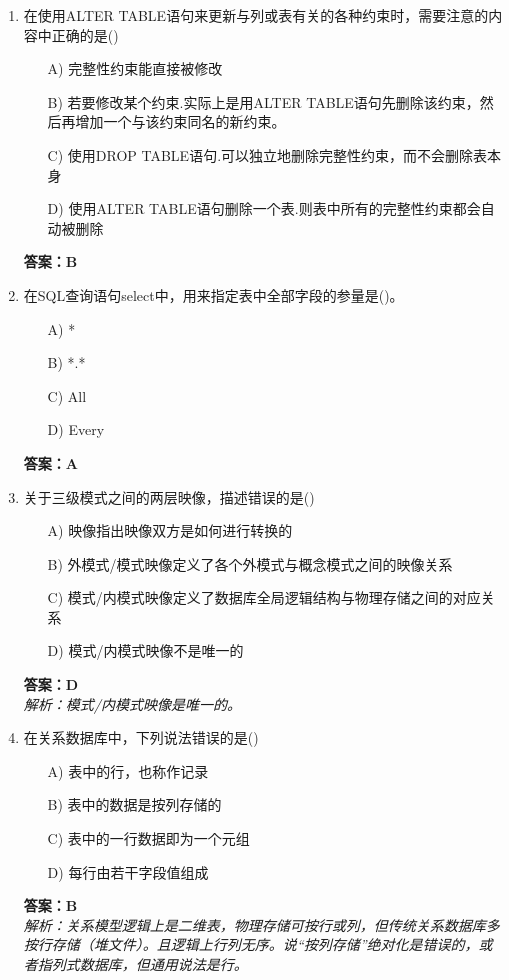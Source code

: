 \documentclass[a4paper,12pt]{article}
\begin{document}
\begin{enumerate}[label=\arabic*.]
\item 在使用ALTER TABLE语句来更新与列或表有关的各种约束时，需要注意的内容中正确的是()
\begin{itemize}
    \item[A)] 完整性约束能直接被修改
    \item[B)] 若要修改某个约束.实际上是用ALTER TABLE语句先删除该约束，然后再增加一个与该约束同名的新约束。
    \item[C)] 使用DROP TABLE语句.可以独立地删除完整性约束，而不会删除表本身
    \item[D)] 使用ALTER TABLE语句删除一个表.则表中所有的完整性约束都会自动被删除
\end{itemize}
\textbf{答案：B}

\item 在SQL查询语句select中，用来指定表中全部字段的参量是()。
\begin{itemize}
    \item[A)] *
    \item[B)] *.*
    \item[C)] All
    \item[D)] Every
\end{itemize}
\textbf{答案：A}

\item 关于三级模式之间的两层映像，描述错误的是()
\begin{itemize}
    \item[A)] 映像指出映像双方是如何进行转换的
    \item[B)] 外模式/模式映像定义了各个外模式与概念模式之间的映像关系
    \item[C)] 模式/内模式映像定义了数据库全局逻辑结构与物理存储之间的对应关系
    \item[D)] 模式/内模式映像不是唯一的
\end{itemize}
\textbf{答案：D} \\
\textit{解析：模式/内模式映像是唯一的。}

\item 在关系数据库中，下列说法错误的是()
\begin{itemize}
    \item[A)] 表中的行，也称作记录
    \item[B)] 表中的数据是按列存储的
    \item[C)] 表中的一行数据即为一个元组
    \item[D)] 每行由若干字段值组成
\end{itemize}
\textbf{答案：B} \\
\textit{解析：关系模型逻辑上是二维表，物理存储可按行或列，但传统关系数据库多按行存储（堆文件）。且逻辑上行列无序。说“按列存储”绝对化是错误的，或者指列式数据库，但通用说法是行。}


\end{enumerate}
\end{document}
